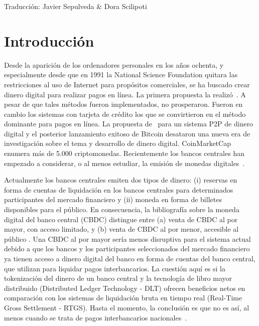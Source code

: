 \documentclass[a4paper,10pt]{article} %
\begin{document}
Traducción: Javier Sepulveda \& Dora Scilipoti


\newpage


\section{Introducción}\label{1.-introducciuxf3n}

Desde la aparición de los ordenadores personales en los años ochenta, y
especialmente desde que en 1991 la National Science Foundation quitara
las restricciones al uso de Internet para propósitos comerciales, se ha
buscado crear dinero digital para realizar pagos en línea. La primera
propuesta la realizó~\citet{Chaum1983}. A pesar de que tales métodos fueron
implementados, no prosperaron. Fueron en cambio los sistemas con tarjeta
de crédito los que se convirtieron en el método dominante para pagos en
línea. La propuesta de~\citet{Nakamoto} para un sistema P2P de dinero
digital y el posterior lanzamiento exitoso de Bitcoin desataron una
nueva era de investigación sobre el tema y desarrollo de dinero digital.
CoinMarketCap enumera más de 5.000 criptomonedas. Recientemente los
bancos centrales han empezado a considerar, o al menos estudiar, la
emisión de monedas digitales~\cite[véase][]{AuerBoehme,AuerCornelli,Boar,Kiff,Mancini-Griffoli}.

Actualmente los bancos centrales emiten dos tipos de dinero: (i)
reservas en forma de cuentas de liquidación en los bancos centrales para
determinados participantes del mercado financiero y (ii) moneda en forma
de billetes disponibles para el público. En consecuencia, la
bibliografía sobre la moneda digital del banco central (CBDC) distingue
entre (a) venta de CBDC al por mayor, con acceso limitado, y (b) venta
de CBDC al por menor, accesible al público \cite[véase, p. ej.][]{Bech}.
Una CBDC al por mayor sería menos disruptiva para el sistema
actual debido a que los bancos y los participantes seleccionados del
mercado financiero ya tienen acceso a dinero digital del banco en forma
de cuentas del banco central, que utilizan para liquidar pagos
interbancarios. La cuestión aquí es si la tokenización del dinero de un
banco central y la tecnología de libro mayor distribuido (Distributed
Ledger Technology - DLT) ofrecen beneficios netos en comparación con los
sistemas de liquidación bruta en tiempo real (Real-Time Gross
Settlement - RTGS). Hasta el momento, la conclusión es que no es así, al
menos cuando se trata de pagos interbancarios nacionales~\cite[véase][]{Chapman}.
\end{document}
